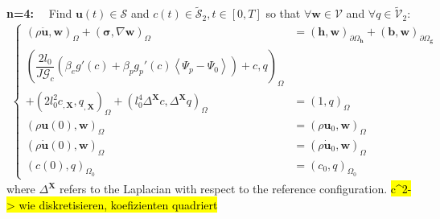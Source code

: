 \textbf{n=4:}$\quad$ Find $\mathbf{u}\left(t\right)\in\bm{\mathcal{S}}$ and $c\left(t\right)\in\tilde{\mathcal{S}}_{2},t\in\left[0,T\right]$ so that $\forall \mathbf{w}\in\bm{\mathcal{V}}$ and $\forall q\in\tilde{\mathcal{V}}_{2}$:
\begin{equation} \label{eq:weak_4_ductile}
\begin{aligned}
\left\{\begin{alignedat}{1}
	\left(\rho \ddot{\mathbf{u}},\mathbf{w}\right)_{\Omega} + \left(\bm{\sigma},\nabla\mathbf{w}\right)_{\Omega} &= \left(\mathbf{h},\mathbf{w}\right)_{\partial\Omega_{\mathbf{h}}} + \left(\mathbf{b},\mathbf{w}\right)_{\partial\Omega_{\mathbf{g}}} \\
	\left(\dfrac{2l_{0}}{J\mathcal{G}_{c}}\left(\beta_{e}g'\left(c\right)+\beta_{p}g_{p}'\left(c\right)\left<\Psi_{p}-\Psi_{0}\right>\right)+c,q\right)_{\Omega} & \\
	+\left(2l_{0}^{2} c_{,\mathbf{X}}, q_{,\mathbf{X}}\right)_{\Omega} + \left(l_{0}^{4}\Delta^{\mathbf{X}} c,\Delta^{\mathbf{X}} q\right)_{\Omega} &= \left(1,q\right)_{\Omega} \\
	\left(\rho\mathbf{u}\left(0\right),\mathbf{w}\right)_{\Omega} &= \left(\rho\mathbf{u}_{0},\mathbf{w}\right)_{\Omega} \\
	\left(\rho\dot{\mathbf{u}}\left(0\right),\mathbf{w}\right)_{\Omega} &= \left(\rho\dot{\mathbf{u}}_{0},\mathbf{w}\right)_{\Omega} \\
	\left(c\left(0\right),q\right)_{\Omega_{0}} &= \left(c_{0},q\right)_{\Omega_{0}}
\end{alignedat}\right.
\end{aligned}
\end{equation} 
where $\Delta^{\mathbf{X}}$ refers to the Laplacian with respect to the reference configuration. \hl{c^2-> wie diskretisieren, koefizienten quadriert}

